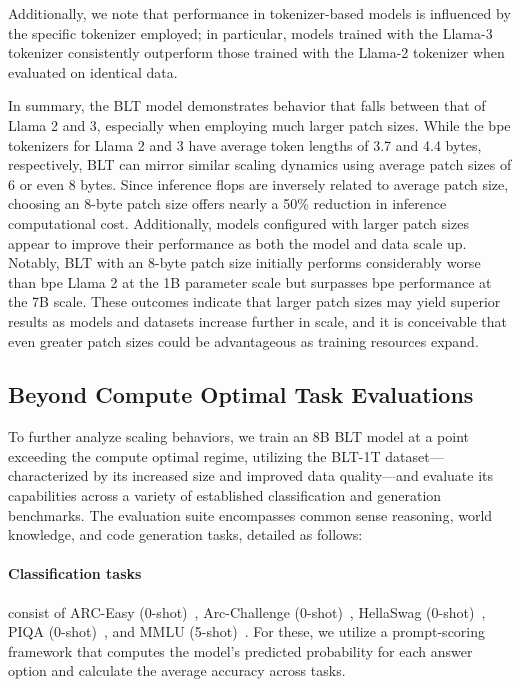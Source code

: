 Additionally, we note that performance in tokenizer-based models is influenced by the specific tokenizer employed; in particular, models trained with the Llama-3 tokenizer consistently outperform those trained with the Llama-2 tokenizer when evaluated on identical data.

In summary, the {\textsc BLT} model demonstrates behavior that falls between that of Llama 2 and 3, especially when employing much larger patch sizes. While the bpe tokenizers for Llama 2 and 3 have average token lengths of 3.7 and 4.4 bytes, respectively, {\textsc BLT} can mirror similar scaling dynamics using average patch sizes of 6 or even 8 bytes. Since inference flops are inversely related to average patch size, choosing an 8-byte patch size offers nearly a 50\% reduction in inference computational cost. Additionally, models configured with larger patch sizes appear to improve their performance as both the model and data scale up. Notably, {\textsc BLT} with an 8-byte patch size initially performs considerably worse than bpe Llama 2 at the 1B parameter scale but surpasses bpe performance at the 7B scale. These outcomes indicate that larger patch sizes may yield superior results as models and datasets increase further in scale, and it is conceivable that even greater patch sizes could be advantageous as training resources expand.

\subsection{Beyond Compute Optimal Task Evaluations}
\label{section:evals}
To further analyze scaling behaviors, we train an 8B {\textsc BLT} model at a point exceeding the compute optimal regime, utilizing the {\textsc BLT}-1T dataset—characterized by its increased size and improved data quality—and evaluate its capabilities across a variety of established classification and generation benchmarks. The evaluation suite encompasses common sense reasoning, world knowledge, and code generation tasks, detailed as follows:
\paragraph{Classification tasks} consist of ARC-Easy (0-shot)~\citep{Eval_ARC}, Arc-Challenge (0-shot)~\citep{Eval_ARC}, HellaSwag (0-shot)~\citep{Eval_hellaswag}, PIQA (0-shot)~\citep{Eval_piqa}, and MMLU (5-shot)~\citep{hendrycks2020measuring}. For these, we utilize a prompt-scoring framework that computes the model's predicted probability for each answer option and calculate the average accuracy across tasks.
